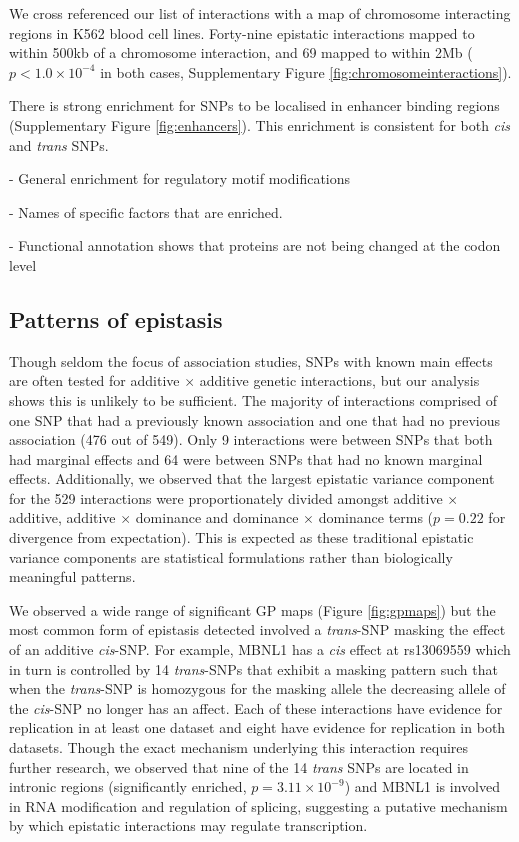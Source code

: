 \documentclass{article}
\begin{document}
We cross referenced our list of interactions with a map of chromosome interacting regions in K562 blood cell lines. Forty-nine epistatic interactions mapped to within 500kb of a chromosome interaction, and 69 mapped to within 2Mb ($p < 1.0 \times 10^{-4}$ in both cases, Supplementary Figure \ref{fig:chromosomeinteractions}). 

There is strong enrichment for SNPs to be localised in enhancer binding regions (Supplementary Figure \ref{fig:enhancers}). This enrichment is consistent for both \emph{cis} and \emph{trans} SNPs.

- General enrichment for regulatory motif modifications

- Names of specific factors that are enriched.

- Functional annotation shows that proteins are not being changed at the codon level


\subsection{Patterns of epistasis}
Though seldom the focus of association studies, SNPs with known main effects are often tested for additive $\times$ additive genetic interactions, but our analysis shows this is unlikely to be sufficient. The majority of interactions comprised of one SNP that had a previously known association and one that had no previous association (476 out of 549). Only 9 interactions were between SNPs that both had marginal effects and 64 were between SNPs that had no known marginal effects. Additionally, we observed that the largest epistatic variance component for the 529 interactions were proportionately divided amongst additive $\times$ additive, additive $\times$ dominance and dominance $\times$ dominance terms ($p = 0.22$ for divergence from expectation). This is expected as these traditional epistatic variance components are statistical formulations rather than biologically meaningful patterns.

We observed a wide range of significant GP maps (Figure \ref{fig:gpmaps}) but the most common form of epistasis detected involved a \emph{trans}-SNP masking the effect of an additive \emph{cis}-SNP. For example, MBNL1 has a \emph{cis} effect at rs13069559 which in turn is controlled by 14 \emph{trans}-SNPs that exhibit a masking pattern such that when the \emph{trans}-SNP is homozygous for the masking allele the decreasing allele of the \emph{cis}-SNP no longer has an affect. Each of these interactions have evidence for replication in at least one dataset and eight have evidence for replication in both datasets. Though the exact mechanism underlying this interaction requires further research, we observed that nine of the 14 \emph{trans} SNPs are located in intronic regions (significantly enriched, $p = 3.11 \times 10^{-9}$) and MBNL1 is involved in RNA modification and regulation of splicing, suggesting a putative mechanism by which epistatic interactions may regulate transcription.
\end{document}

